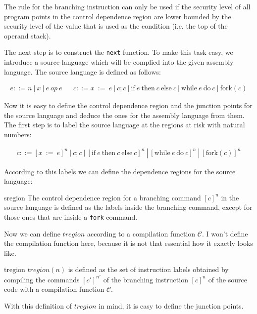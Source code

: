 \documentclass[a4paper,10pt]{llncs}
\begin{document}
The rule for the branching instruction can only be used if the security level of all program
points in the control dependence region are lower bounded by the security level of the value
that is used as the condition (i.e. the top of the operand stack). 

The next step is to construct the \texttt{next} function. To make this task easy, we introduce
a source language which will be complied into the given assembly language. The source language
is defined as follows:

\begin{align*}
e ::= n\ |\ x\ |\ e\ op\ e && c ::= x\ :=\ e\ |\ c;c\ |\ \text{if}\ e\ \text{then}\ c\ \text{else}\ c\ |\ \text{while}\ e\ \text{do}\ c\ |\ \text{fork}(c)
\end{align*}

Now it is easy to define the control dependence region and the junction points for the source
language and deduce the ones for the assembly language from them. The first step is to label the
source language at the regions at risk with natural numbers:

\begin{align*}
c ::= [x\ :=\ e]^n\ |\ c;c\ |\ [\text{if}\ e\ \text{then}\ c\ \text{else}\ c]^n\ |\ [\text{while}\ e\ \text{do}\ c]^n\ |\ [\text{fork}(c)]^n
\end{align*}

According to this labels we can define the dependence regions for the source language:

\begin{definition}{sregion}
The control dependence region for a branching command $[c]^n$ in the source language is
defined as the labels inside the branching command, except for those ones that are inside a
\texttt{fork} command.
\end{definition}

Now we can define $tregion$ according to a compilation function $\mathcal{C}$. I won't define
the compilation function here, because it is not that essential how it exactly looks like.

\begin{definition}{tregion}
$tregion(n)$ is defined as the set of instruction labels obtained by compiling the commands
$[c']^{n'}$ of the branching instruction $[c]^n$ of the source code with a compilation function $\mathcal{C}$.
\end{definition}

With this definition of $tregion$ in mind, it is easy to define the junction points.
\end{document}

